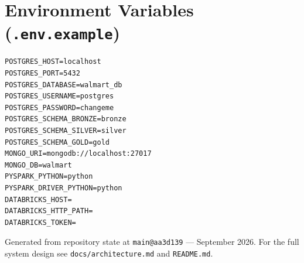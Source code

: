 \documentclass[11pt,a4paper]{article}
\begin{document}
\section{Environment Variables (\texttt{.env.example})}
\begin{lstlisting}[style=bash]
POSTGRES_HOST=localhost
POSTGRES_PORT=5432
POSTGRES_DATABASE=walmart_db
POSTGRES_USERNAME=postgres
POSTGRES_PASSWORD=changeme
POSTGRES_SCHEMA_BRONZE=bronze
POSTGRES_SCHEMA_SILVER=silver
POSTGRES_SCHEMA_GOLD=gold
MONGO_URI=mongodb://localhost:27017
MONGO_DB=walmart
PYSPARK_PYTHON=python
PYSPARK_DRIVER_PYTHON=python
DATABRICKS_HOST=
DATABRICKS_HTTP_PATH=
DATABRICKS_TOKEN=
\end{lstlisting}

\vfill
\begin{center}
\small\textcolor{muted}{Generated from repository state at \texttt{main@aa3d139} — September 2026. For the full system design see \texttt{docs/architecture.md} and \texttt{README.md}.}
\end{center}
\end{document}
